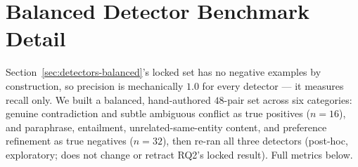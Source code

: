 \documentclass[11pt]{article}
\begin{document}
\begin{table}[t]
  \centering
  \small
  \caption{Resolvable-only accuracy, new $n{=}120$ sample vs.\ locked
  $n{=}120$. On the new sample, \textsc{ConfidenceRuleMerge} and
  \textsc{TwoWayLLMMerge} both tie \textsc{ThreeWayLLMMerge}
  ($p{=}0.317$ both, diff $-0.008$); \textsc{RawTextLLMMerge} again scores
  $0.000$. All four naive-baseline differences vs.\ \textsc{ThreeWayLLMMerge}
  are large and significant (Wilcoxon $p<10^{-5}$; e.g.\ vs.\
  last\_writer\_wins: diff $+0.425$, $95\%$ CI $[0.325,0.525]$).}
  \label{tab:power-expansion}
\end{table}

\section{Balanced Detector Benchmark Detail}
\label{sec:detectors-balanced-detail}

Section~\ref{sec:detectors-balanced}'s locked set has no negative examples
by construction, so precision is mechanically $1.0$ for every detector ---
it measures recall only. We built a balanced, hand-authored $48$-pair set
across six categories: genuine contradiction and subtle ambiguous conflict
as true positives ($n{=}16$), and paraphrase, entailment,
unrelated-same-entity content, and preference refinement as true negatives
($n{=}32$), then re-ran all three detectors (post-hoc, exploratory; does
not change or retract RQ2's locked result). Full metrics below.
\end{document}
